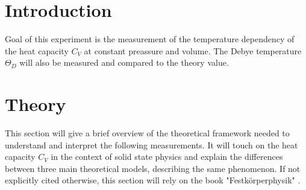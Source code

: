 \section{Introduction}
\label{sec:Zielsetzung}
Goal of this experiment is the measurement of the temperature dependency of the heat capacity $C_V$ at constant preassure and volume. 
The Debye temperature $\Theta_D$ will also be measured and compared to the theory value.

\section{Theory}
\label{sec:Theorie}
This section will give a brief overview of the theoretical framework needed to understand and interpret the following measurements. It will touch on the heat capacity $C_V$ in the context of solid state physics and explain the differences between three main theoretical models, describing the same phenomenon.
If not explicitly cited otherwise, this section will rely on the book "Festkörperphysik" \cite{rehab}.

